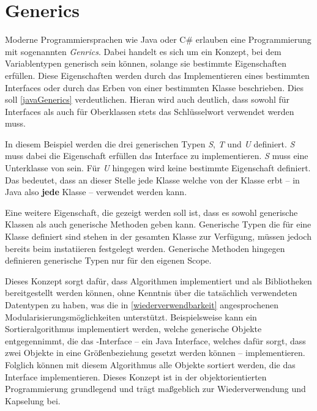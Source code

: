 \section{Generics}
Moderne Programmiersprachen wie Java oder C\# erlauben eine Programmierung mit sogenannten \textit{Genrics}. Dabei handelt es sich um ein Konzept, bei dem Variablentypen generisch sein können, solange sie bestimmte Eigenschaften erfüllen. Diese Eigenschaften werden durch das Implementieren eines bestimmten Interfaces oder durch das Erben von einer bestimmten Klasse beschrieben. Dies soll \autoref{javaGenerics} verdeutlichen. Hieran wird auch deutlich, dass sowohl für Interfaces als auch für Oberklassen stets das Schlüsselwort  verwendet werden muss.


In diesem Beispiel werden die drei generischen Typen \textit{S}, \textit{T} und \textit{U} definiert. \textit{S} muss dabei die Eigenschaft erfüllen das  Interface zu implementieren. \textit{S} muss eine Unterklasse von  sein. Für \textit{U} hingegen wird keine bestimmte Eigenschaft definiert. Das bedeutet, dass an dieser Stelle jede Klasse welche von der Klasse  erbt -- in Java also \textbf{jede} Klasse -- verwendet werden kann. 

Eine weitere Eigenschaft, die gezeigt werden soll ist, dass es sowohl generische Klassen als auch generische Methoden geben kann. Generische Typen die für eine Klasse definiert sind stehen in der gesamten Klasse zur Verfügung, müssen jedoch bereits beim instatiieren festgelegt werden. Generische Methoden hingegen definieren generische Typen nur für den eigenen Scope.

Dieses Konzept sorgt dafür, dass Algorithmen implementiert und als Bibliotheken bereitgestellt werden können, ohne Kenntnis über die tatsächlich verwendeten Datentypen zu haben, was die in \autoref{wiederverwendbarkeit} angesprochenen Modularisierungsmöglichkeiten unterstützt. Beispielsweise kann ein Sortieralgorithmus implementiert werden, welche generische Objekte entgegennimmt, die das -Interface -- ein Java Interface, welches dafür sorgt, dass zwei Objekte in eine Größenbeziehung gesetzt werden können -- implementieren. Folglich können mit diesem Algorithmus alle Objekte sortiert werden, die das Interface implementieren. Dieses Konzept ist in der objektorientierten Programmierung grundlegend und trägt maßgeblich zur Wiederverwendung und Kapselung bei.